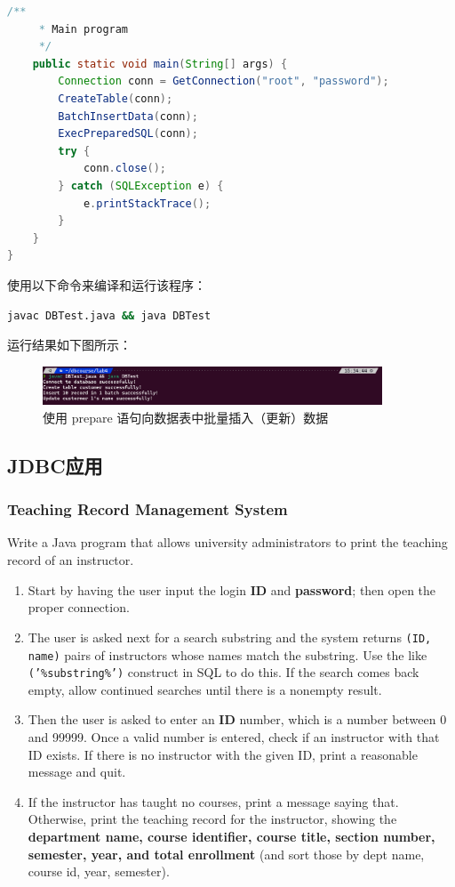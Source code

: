 \documentclass{article}
\renewcommand\tt{\texttt}
\begin{document}
\begin{lstlisting}[language=java]
    /**
     * Main program
     */
    public static void main(String[] args) {
        Connection conn = GetConnection("root", "password");
        CreateTable(conn);
        BatchInsertData(conn);
        ExecPreparedSQL(conn);
        try {
            conn.close();
        } catch (SQLException e) {
            e.printStackTrace();
        }
    }
}
\end{lstlisting}

使用以下命令来编译和运行该程序：

\begin{lstlisting}[language=bash]
javac DBTest.java && java DBTest
\end{lstlisting}

运行结果如下图所示：

\begin{figure}[H]
  \centering
  \includegraphics[width=0.9\textwidth]{img/11.png}
  \caption{使用 prepare 语句向数据表中批量插入（更新）数据}
\end{figure}

\subsection{JDBC应用}

\subsubsection{Teaching Record Management System}
Write a Java program that allows university administrators to print the teaching record of an instructor.

\begin{enumerate}[label=(\alph*)]
  \item Start by having the user input the login \textbf{ID} and \textbf{password}; then open the proper connection.
  \item The user is asked next for a search substring and the system returns \tt{(ID, name)} pairs of instructors whose names match the substring. Use the like \tt{('\%substring\%')} construct in SQL to do this. If the search comes back empty, allow continued searches until there is a nonempty result.
  \item Then the user is asked to enter an \textbf{ID} number, which is a number between 0 and 99999. Once a valid number is entered, check if an instructor with that ID exists. If there is no instructor with the given ID, print a reasonable message and quit.
  \item If the instructor has taught no courses, print a message saying that. Otherwise, print the teaching record for the instructor, showing the \textbf{department name, course identifier, course title, section number, semester, year, and total enrollment} (and sort those by dept name, course id, year, semester).
\end{enumerate}
\end{document}
